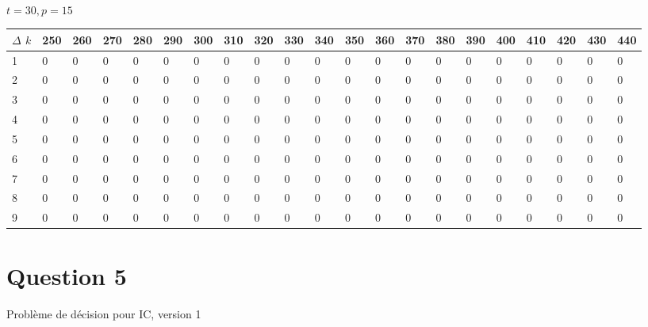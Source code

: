 \documentclass[11pt]{article}
\begin{document}
\paragraph{}
$t =  30, p =  15$
\begin{center} \tiny \begin{tabular}{|l |l |l |l |l |l |l |l |l |l |l |l |l |l |l |l |l |l |l |l |l |} \hline
$\Delta$ $k$ &250 & 260 & 270 & 280 & 290 & 300 & 310 & 320 & 330 & 340 & 350 & 360 & 370 & 380 & 390 & 400 & 410 & 420 & 430 & 440  \\ \hline
1 & 0 & 0 & 0 & 0 & 0 & 0 & 0 & 0 & 0 & 0 & 0 & 0 & 0 & 0 & 0 & 0 & 0 & 0 & 0 & 0  \\ \hline
2 & 0 & 0 & 0 & 0 & 0 & 0 & 0 & 0 & 0 & 0 & 0 & 0 & 0 & 0 & 0 & 0 & 0 & 0 & 0 & 0  \\ \hline
3 & 0 & 0 & 0 & 0 & 0 & 0 & 0 & 0 & 0 & 0 & 0 & 0 & 0 & 0 & 0 & 0 & 0 & 0 & 0 & 0  \\ \hline
4 & 0 & 0 & 0 & 0 & 0 & 0 & 0 & 0 & 0 & 0 & 0 & 0 & 0 & 0 & 0 & 0 & 0 & 0 & 0 & 0  \\ \hline
5 & 0 & 0 & 0 & 0 & 0 & 0 & 0 & 0 & 0 & 0 & 0 & 0 & 0 & 0 & 0 & 0 & 0 & 0 & 0 & 0  \\ \hline
6 & 0 & 0 & 0 & 0 & 0 & 0 & 0 & 0 & 0 & 0 & 0 & 0 & 0 & 0 & 0 & 0 & 0 & 0 & 0 & 0  \\ \hline
7 & 0 & 0 & 0 & 0 & 0 & 0 & 0 & 0 & 0 & 0 & 0 & 0 & 0 & 0 & 0 & 0 & 0 & 0 & 0 & 0  \\ \hline
8 & 0 & 0 & 0 & 0 & 0 & 0 & 0 & 0 & 0 & 0 & 0 & 0 & 0 & 0 & 0 & 0 & 0 & 0 & 0 & 0  \\ \hline
9 & 0 & 0 & 0 & 0 & 0 & 0 & 0 & 0 & 0 & 0 & 0 & 0 & 0 & 0 & 0 & 0 & 0 & 0 & 0 & 0  \\ \hline
\end{tabular}\end{center}
\section{Question 5}

\begin{algorithm}[H]
\SetAlgoLined
{}
	\caption{Problème de décision pour IC, version 1}
\end{algorithm}
\end{document}

